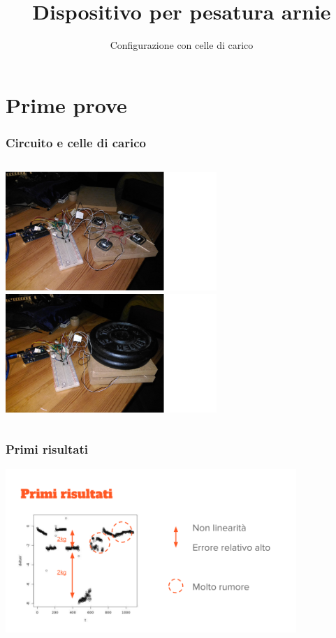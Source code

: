 \documentclass{beamer}
\title%
{Dispositivo per pesatura arnie}
\subtitle{Configurazione con celle di carico}
\begin{document}
\frame{\titlepage}



\section{Prime prove}
\begin{frame}
  \frametitle{Circuito e celle di carico}
  \begin{columns}[c] %
      \includegraphics[height=4.5cm]{../Foto/Prime_prove/circuito.png}
      \includegraphics[height=4.5cm]{../Foto/Prime_prove/circuito_in_funzione.png}
  \end{columns}
\end{frame}
\begin{frame}
  \frametitle{Primi risultati}
  \includegraphics[width=11cm]{../Foto/Prime_prove/primi_risultati}
\end{frame}
\end{document}
